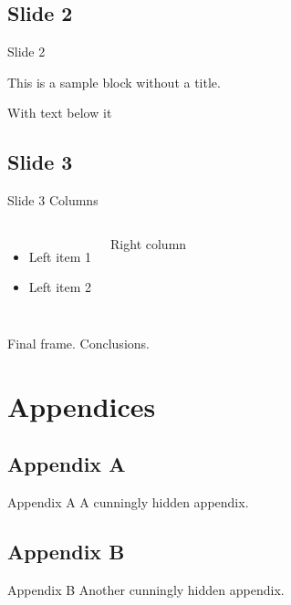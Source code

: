 \documentclass[compress,ignorenonframetext]{beamer}
\begin{document}
\subsection{Slide 2}
\begin{frame}{Slide 2}
\begin{block}{}
This is a sample block without a title.
\end{block}
With text below it
\end{frame}

\subsection{Slide 3}
\begin{frame}{Slide 3}
Columns
\begin{columns}
\begin{itemize}
\item Left item 1
\item Left item 2
\end{itemize}
Right column
\end{columns}
\end{frame}

\begin{frame}
Final frame. Conclusions.
%
\setcounter{finalframe}{\value{framenumber}}
\end{frame}

\appendix

\section{Appendices}
\subsection{Appendix A}
\begin{frame}[noframenumbering]{Appendix A}
A cunningly hidden appendix.
\end{frame}


\subsection{Appendix B}
\begin{frame}[noframenumbering]{Appendix B}
%
Another cunningly hidden appendix.
%
\setcounter{framenumber}{\value{finalframe}} %
\end{frame}
\end{document}
